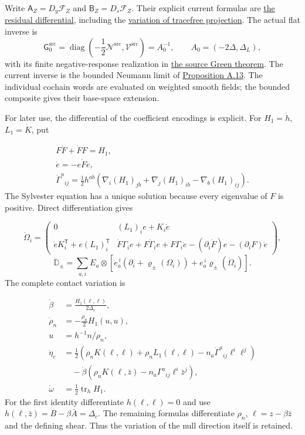 \documentclass[
  english,
  11pt,
  reqno]{amsart}
\begin{document}
Write \(\mathsf A_Z=D_y\mathcal F_Z\) and
\(\mathsf B_Z=D_s\mathcal F_Z\). Their explicit current formulas are
\hyperref[eq:online-current-explicit-linearized-residual]{the residual
differential}, including the
\hyperref[eq:online-current-tracefree-variation]{variation of tracefree
projection}. The actual flat inverse is \[
\mathsf G_0^{\mathrm{src}}
=\operatorname{diag}\left(-\frac12\mathcal N^{\mathrm{src}},\mathcal V^{\mathrm{src}}\right)
=A_0^{-1},\qquad A_0=(-2\Delta,\Delta_L),
\] with its finite negative-response realization in
\hyperref[thm:online-negative-response-flat-green]{the source Green
theorem}. The current inverse is the bounded Neumann limit of
\hyperref[prop:online-current-inverse-horizontal-flatness]{Proposition
A.13}. The individual cochain words are evaluated on weighted smooth
fields; the bounded composite gives their base-space extension.

For later use, the differential of the coefficient encodings is
explicit. For \(H_1=\dot h\), \(L_1=\dot K\), put

\label{eq:online-source-positive-frame-variation} \[
\begin{gathered}
F\dot F+\dot F F=H_1, \\
\dot e=-e\dot F e, \\
\dot\Gamma^a{}_{ij}
=\frac12h^{ab}(\nabla_i(H_1)_{jb}+\nabla_j(H_1)_{ib}-\nabla_b(H_1)_{ij}).
\end{gathered}
\] The Sylvester equation has a unique solution because every eigenvalue
of \(F\) is positive. Direct differentiation gives

\label{eq:online-source-full-connection-variation} \[
\dot\Omega_i=
\begin{pmatrix}
0&(L_1)_ie+K_i\dot e\\
\dot eK_i^{\mathsf T}+e(L_1)_i^{\mathsf T}
&\dot F\Gamma_i e+F\dot\Gamma_i e+F\Gamma_i\dot e
 -(\partial_i\dot F)e-(\partial_iF)\dot e
\end{pmatrix},
\] \label{eq:online-source-full-gradient-variation} \[
\dot{\mathbb D}_\pm
=\sum_{a,i}E_a\otimes
\left[\dot e_a^{\,i}(\partial_i+\varrho_\pm(\Omega_i))
+e_a^{\,i}\varrho_\pm(\dot\Omega_i)\right].
\] The complete contact variation is

\label{eq:online-source-full-contact-variation} \[
\begin{aligned}
\dot\beta&=\frac{H_1(\ell,\ell)}{2\Delta_c}, \\
\dot\rho_n&=-\frac{\rho_n}{2}H_1(u,u), \\
u&=h^{-1}n/\rho_n, \\
\dot\eta_c
&=\frac12\left(\dot\rho_nK(\ell,\ell)
+\rho_nL_1(\ell,\ell)-n_a\dot\Gamma^a{}_{ij}\ell^i\ell^j\right) \\
&\quad-\dot\beta\left(\rho_nK(\ell,\bar z)
-n_a\Gamma^a{}_{ij}\ell^i\bar z^j\right), \\
\dot\omega&=\frac12\operatorname{tr}_hH_1.
\end{aligned}
\] For the first identity differentiate \(h(\ell,\ell)=0\) and use
\(h(\ell,\bar z)=B-\beta\bar A=\Delta_c\). The remaining formulas
differentiate \(\rho_n\), \(\ell=z-\beta\bar z\) and the defining shear.
Thus the variation of the null direction itself is retained.
\end{document}
